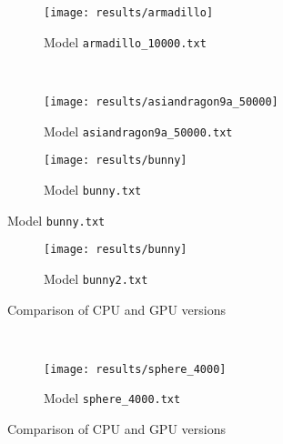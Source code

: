 	\begin{figure}
		\centering
		\begin{subfigure}[b]{0.45\textwidth}
			\texttt{[image: results/armadillo]}
			\caption{Model \texttt{armadillo_10000.txt}}
		\end{subfigure}
		~%
		\begin{subfigure}[b]{0.45\textwidth}
			\texttt{[image: results/asiandragon9a\_50000]}
			\caption{Model \texttt{asiandragon9a\_50000.txt}}
		\end{subfigure}
		
		\begin{subfigure}[b]{0.45\textwidth}
			\texttt{[image: results/bunny]}
			\caption{Model \texttt{bunny.txt}}
		\end{subfigure}
		\label{fig:results}
	\end{figure}
	\begin{figure}
		\ContinuedFloat
		\center
		\begin{subfigure}[b]{0.45\textwidth}
			\texttt{[image: results/bunny]}
			\caption{Model \texttt{bunny2.txt}}
		\end{subfigure}
		\caption{Comparison of CPU and GPU versions}
		~%
		\begin{subfigure}[b]{0.45\textwidth}
			\texttt{[image: results/sphere\_4000]}
			\caption{Model \texttt{sphere\_4000.txt}}
		\end{subfigure}
		\caption[]{Comparison of CPU and GPU versions}
		\label{fig:results}
	\end{figure}
